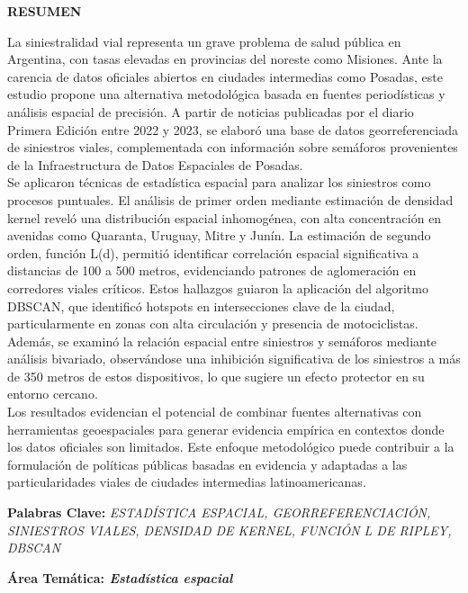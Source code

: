 \documentclass[11pt]{article}
\begin{document}
\begin{center}
\vspace{0.9cm}
\begin{Large}
\textbf{RESUMEN}
\end{Large}
\end{center}
La siniestralidad vial representa un grave problema de salud pública en Argentina, con tasas elevadas en provincias del noreste como Misiones. Ante la carencia de datos oficiales abiertos en ciudades intermedias como Posadas, este estudio propone una alternativa metodológica basada en fuentes periodísticas y análisis espacial de precisión. A partir de noticias publicadas por el diario Primera Edición entre 2022 y 2023, se elaboró una base de datos georreferenciada de siniestros viales, complementada con información sobre semáforos provenientes de la Infraestructura de Datos Espaciales de Posadas.\\
Se aplicaron técnicas de estadística espacial para analizar los siniestros como procesos puntuales. El análisis de primer orden mediante estimación de densidad kernel reveló una distribución espacial inhomogénea, con alta concentración en avenidas como Quaranta, Uruguay, Mitre y Junín. La estimación de segundo orden, función L(d), permitió identificar correlación espacial significativa a distancias de 100 a 500 metros, evidenciando patrones de aglomeración en corredores viales críticos. Estos hallazgos guiaron la aplicación del algoritmo DBSCAN, que identificó hotspots en intersecciones clave de la ciudad, particularmente en zonas con alta circulación y presencia de motociclistas. Además, se examinó la relación espacial entre siniestros y semáforos mediante análisis bivariado, observándose una inhibición significativa de los siniestros a más de 350 metros de estos dispositivos, lo que sugiere un efecto protector en su entorno cercano.\\
Los resultados evidencian el potencial de combinar fuentes alternativas con herramientas geoespaciales para generar evidencia empírica en contextos donde los datos oficiales son limitados. Este enfoque metodológico puede contribuir a la formulación de políticas públicas basadas en evidencia y adaptadas a las particularidades viales de ciudades intermedias latinoamericanas. 

\vspace{0.9cm}

\noindent \textbf{Palabras Clave:} \textit{ESTADÍSTICA ESPACIAL, GEORREFERENCIACIÓN, SINIESTROS VIALES, DENSIDAD DE KERNEL, FUNCIÓN L DE RIPLEY, DBSCAN}

\vspace{0.9cm}

\noindent \textbf{Área Temática: \textit{Estadística espacial}}
\end{document}
